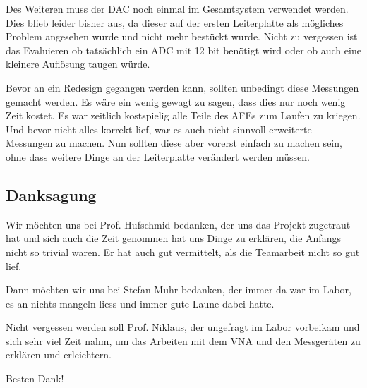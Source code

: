 Des Weiteren muss der DAC noch einmal im Gesamtsystem verwendet werden. Dies blieb leider bisher aus, da dieser auf der ersten Leiterplatte als mögliches Problem angesehen wurde und nicht mehr bestückt wurde.
Nicht zu vergessen ist das Evaluieren ob tatsächlich ein ADC mit 12 bit benötigt wird oder ob auch eine kleinere Auflösung taugen würde.

Bevor an ein Redesign gegangen werden kann, sollten unbedingt diese Messungen gemacht werden. Es wäre ein wenig gewagt zu sagen, dass dies nur noch wenig Zeit kostet. Es war zeitlich kostspielig alle Teile des AFEs zum Laufen zu kriegen. Und bevor nicht alles korrekt lief, war es auch nicht sinnvoll erweiterte Messungen zu machen. Nun sollten diese aber vorerst einfach zu machen sein, ohne dass weitere Dinge an der Leiterplatte verändert werden müssen.

\subsection*{Danksagung}

Wir möchten uns bei Prof. Hufschmid bedanken, der uns das Projekt zugetraut hat und sich auch die Zeit genommen hat uns Dinge zu erklären, die Anfangs nicht so trivial waren. Er hat auch gut vermittelt, als die Teamarbeit nicht so gut lief.

Dann möchten wir uns bei Stefan Muhr bedanken, der immer da war im Labor, es an nichts mangeln liess und immer gute Laune dabei hatte.

Nicht vergessen werden soll Prof. Niklaus, der ungefragt im Labor vorbeikam und sich sehr viel Zeit nahm, um das Arbeiten mit dem VNA und den Messgeräten zu erklären und erleichtern.

Besten Dank!